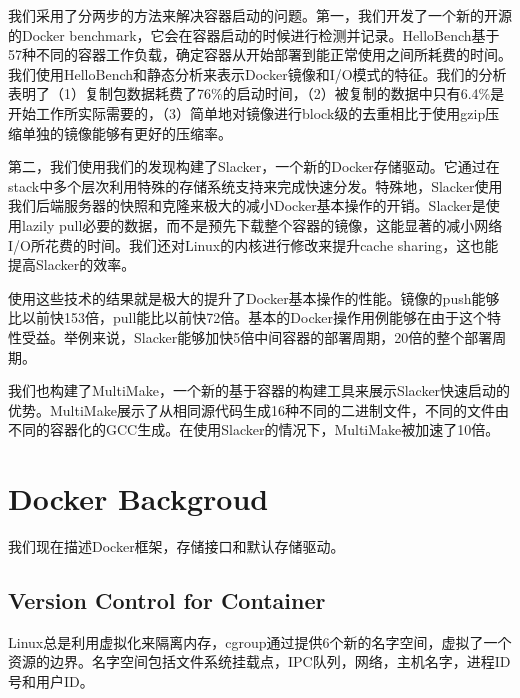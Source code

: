 \documentclass[UTF8]{ctexart}
\begin{document}
我们采用了分两步的方法来解决容器启动的问题。第一，我们开发了一个新的开源的Docker benchmark，它会在容器启动的时候进行检测并记录。HelloBench基于57种不同的容器工作负载，确定容器从开始部署到能正常使用之间所耗费的时间。我们使用HelloBench和静态分析来表示Docker镜像和I/O模式的特征。我们的分析表明了（1）复制包数据耗费了76\%的启动时间，（2）被复制的数据中只有6.4\%是开始工作所实际需要的，（3）简单地对镜像进行block级的去重相比于使用gzip压缩单独的镜像能够有更好的压缩率。

第二，我们使用我们的发现构建了Slacker，一个新的Docker存储驱动。它通过在stack中多个层次利用特殊的存储系统支持来完成快速分发。特殊地，Slacker使用我们后端服务器的快照和克隆来极大的减小Docker基本操作的开销。Slacker是使用lazily pull必要的数据，而不是预先下载整个容器的镜像，这能显著的减小网络I/O所花费的时间。我们还对Linux的内核进行修改来提升cache sharing，这也能提高Slacker的效率。

使用这些技术的结果就是极大的提升了Docker基本操作的性能。镜像的push能够比以前快153倍，pull能比以前快72倍。基本的Docker操作用例能够在由于这个特性受益。举例来说，Slacker能够加快5倍中间容器的部署周期，20倍的整个部署周期。

我们也构建了MultiMake，一个新的基于容器的构建工具来展示Slacker快速启动的优势。MultiMake展示了从相同源代码生成16种不同的二进制文件，不同的文件由不同的容器化的GCC生成。在使用Slacker的情况下，MultiMake被加速了10倍。

\section{Docker Backgroud}
我们现在描述Docker框架，存储接口和默认存储驱动。
\subsection{Version Control for Container}
Linux总是利用虚拟化来隔离内存，cgroup通过提供6个新的名字空间，虚拟了一个资源的边界。名字空间包括文件系统挂载点，IPC队列，网络，主机名字，进程ID号和用户ID。
\end{document}
